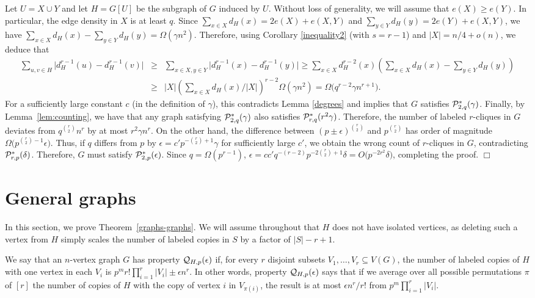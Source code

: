 \documentclass[11pt]{article}
\begin{document}
Let $U=X \cup Y$ and let $H=G[U]$ be the subgraph of $G$ induced by $U$. Without loss of generality, we will assume that $e(X) \geq e(Y)$. 
In particular, the edge density in $X$ is at least $q$. 
Since 
$\sum_{x \in X} d_H(x)=2e(X)+e(X,Y)$  and
$\sum_{y \in Y} d_H(y)=2e(Y)+e(X,Y)$, we have 
$\sum_{x \in X} d_H(x)-\sum_{y \in Y} d_H(y) =  \Omega(\gamma n^2)$.
Therefore, using Corollary \ref{inequality2} (with $s=r-1$) and $|X|=n/4+o(n)$, we deduce that
\begin{eqnarray*}
\sum_{u,v \in H} \big|d_H^{r-1}(u)-d_H^{r-1}(v)\big| &\geq& \sum_{x \in X, y \in Y} \big|d_H^{r-1}(x)-d_H^{r-1}(y)\big|
\geq \sum_{x \in X} d_H^{r-2}(x) \left(\sum_{x \in X} d_H(x)- \sum_{y \in Y} d_H(y) \right)\\
&\geq& |X| \left( \sum_{x \in X} d_H(x)/|X| \right)^{r-2}  \Omega(\gamma n^2)=\Omega\big(q^{r-2} \gamma n^{r+1}\big).
\end{eqnarray*}
For a sufficiently large constant $c$ (in the definition of $\gamma$), this contradicts Lemma \ref{degrees} and implies that 
$G$ satisfies ${\cal P}^*_{2,q}(\gamma)$. Finally, by Lemma~\ref{lem:counting}, we have that any graph satisfying
${\cal P}^*_{2,q}(\gamma)$ also satisfies ${\cal P}^*_{r,q}(r^2\gamma)$. Therefore, the number of labeled $r$-cliques in $G$ deviates from
$q^{r \choose 2}n^r$ by at most $r^2 \gamma n^r$.  On the other hand, the difference between
$(p \pm \epsilon)^{r \choose 2}$ and $p^{r \choose 2}$ has order of magnitude $\Omega\big(p^{{r \choose 2}-1}\epsilon\big)$. Thus, if $q$ differs from $p$ by $\epsilon=c' p^{-{r \choose 2}+1}\gamma$ for sufficiently large $c'$, we obtain the wrong count of $r$-cliques in $G$, contradicting ${\cal P}^*_{r,p}(\delta)$. Therefore, $G$ must satisfy ${\cal P}^*_{2,p}(\epsilon)$. Since $q = \Omega(p^{r-1})$, $\epsilon = c c' q^{-(r-2)} p^{-2\binom{r}{2} + 1} \delta = O\big(p^{-2 r^2} \delta\big)$, completing the proof.
\hfill $\Box$

\section{General graphs} \label{sec:general}

In this section, we prove Theorem~\ref{graphs-graphs}. We will assume throughout that $H$ does not have isolated vertices, as deleting such a vertex from $H$ simply scales the number of labeled copies in $S$ by a factor of $|S|-r+1$. 

We say that an $n$-vertex graph $G$ has property ${\cal Q}_{H,p}(\epsilon)$ if, for every $r$ disjoint subsets $V_1,\ldots,V_r \subseteq V(G)$, the number of labeled copies of $H$ with one vertex in each $V_i$ is $p^{m}r!\prod_{i=1}^r |V_i| \pm \epsilon n^r$. 
In other words, property ${\cal Q}_{H,p}(\epsilon)$ says that if we average over all possible permutations $\pi$ of $[r]$ the number of copies of $H$ with the copy of vertex $i$ in $V_{\pi(i)}$, the result is at most $\epsilon n^r/r!$ from $p^m\prod_{i=1}^r |V_i|$.
\end{document}
